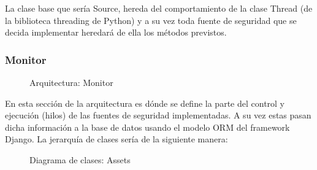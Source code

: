 La clase base que sería Source, hereda del comportamiento de la clase Thread (de la biblioteca threading de Python) y a su vez toda fuente de seguridad que se decida implementar heredará de ella los métodos previstos.\\
\newpage

\subsubsection{Monitor}

\begin{figure}[H]
  \caption{Arquitectura: Monitor}
\end{figure}

En esta sección de la arquitectura es dónde se define la parte del control y ejecución (hilos) de las fuentes de seguridad implementadas. A su vez estas pasan dicha información a la base de datos usando el modelo ORM del framework Django. La jerarquía de clases sería de la siguiente manera: \\

\begin{figure}[H]
  \caption{Diagrama de clases: Assets}
\end{figure}

